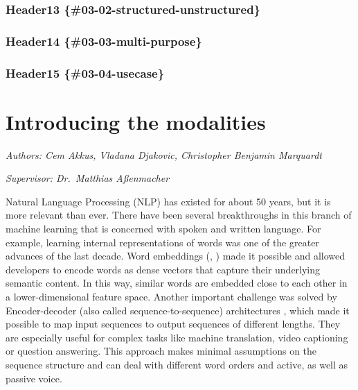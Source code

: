 \documentclass[
]{krantz}
\begin{document}
\hypertarget{header13-03-02-structured-unstructured}{%
\subsection{Header13 \{\#03-02-structured-unstructured\}}\label{header13-03-02-structured-unstructured}}

\hypertarget{header14-03-03-multi-purpose}{%
\subsection{Header14 \{\#03-03-multi-purpose\}}\label{header14-03-03-multi-purpose}}

\hypertarget{header15-03-04-usecase}{%
\subsection{Header15 \{\#03-04-usecase\}}\label{header15-03-04-usecase}}

\hypertarget{introducing-the-modalities}{%
\chapter{Introducing the modalities}\label{introducing-the-modalities}}

\emph{Authors: Cem Akkus, Vladana Djakovic, Christopher Benjamin Marquardt}

\emph{Supervisor: Dr.~Matthias Aßenmacher}

Natural Language Processing (NLP) has existed for about 50 years, but it is more relevant than ever. There have been several breakthroughs in this branch of machine learning that is concerned with spoken and written language. For example, learning internal representations of words was one of the greater advances of the last decade. Word embeddings (\citet{Mikolov2013}, \citet{Bojanowski2016}) made it possible and allowed developers to encode words as dense vectors that capture their underlying semantic content. In this way, similar words are embedded close to each other in a lower-dimensional feature space. Another important challenge was solved by Encoder-decoder (also called sequence-to-sequence) architectures \citet{Sutskever2014}, which made it possible to map input sequences to output sequences of different lengths. They are especially useful for complex tasks like machine translation, video captioning or question answering. This approach makes minimal assumptions on the sequence structure and can deal with different word orders and active, as well as passive voice.
\end{document}
